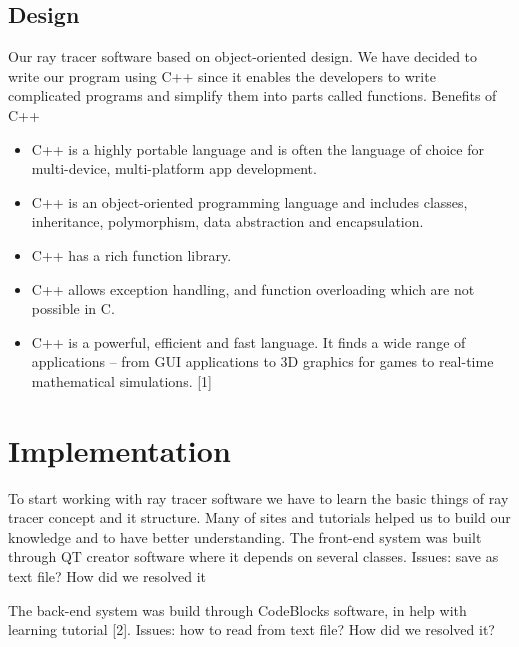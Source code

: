 \documentclass{article}
\begin{document}
\subsection{Design}

Our ray tracer software based on object-oriented design. We have decided to write our program using C++ since it enables the developers to write complicated programs and simplify them into parts called functions. 
Benefits of C++
\begin{itemize}
    \item 
	C++ is a highly portable language and is often the language of choice for multi-device, multi-platform app development.
\item	C++ is an object-oriented programming language and includes classes, inheritance, polymorphism, data abstraction and encapsulation.
\item	C++ has a rich function library.
\item	C++ allows exception handling, and function overloading which are not possible in C.
\item	C++ is a powerful, efficient and fast language. It finds a wide range of applications – from GUI applications to 3D graphics for games to real-time mathematical simulations. [1]

\end{itemize}

\section{Implementation}
To start working with ray tracer software we have to learn the basic things of ray tracer concept and it structure. Many of sites and tutorials helped us to build our knowledge and to have better understanding. 
The front-end system was built through QT creator software where it depends on several classes.
Issues: save as text file? How did we resolved it

The back-end system was build through CodeBlocks software, in help with learning tutorial [2].
Issues: how to read from text file? How did we resolved it?
\end{document}
